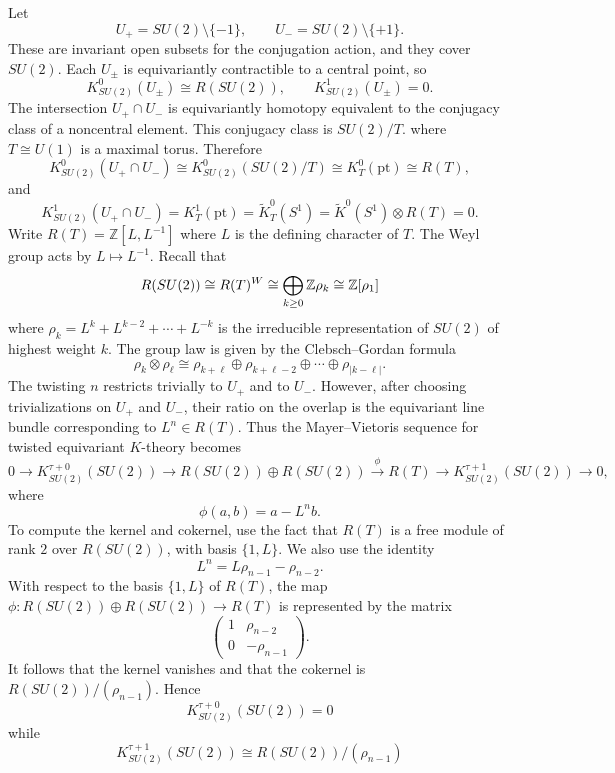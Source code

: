 \documentclass[12pt]{article}
\begin{document}
\begin{example}
    Let
    \[
        U_+=SU(2)\setminus\{-1\},
        \qquad
        U_-=SU(2)\setminus\{+1\}.
    \]
    These are invariant open subsets for the conjugation action, and they cover $SU(2)$. Each $U_\pm$ is equivariantly contractible to a central point, so
    \[
        K^0_{SU(2)}(U_\pm)\cong R(SU(2)),
        \qquad
        K^1_{SU(2)}(U_\pm)=0.
    \]
    The intersection $U_+\cap U_-$ is equivariantly homotopy equivalent to the conjugacy class of a noncentral element. This conjugacy class is $SU(2)/T$.
    where $T\cong U(1)$ is a maximal torus. Therefore
    \[
        K^0_{SU(2)}(U_+\cap U_-)
        \cong
        K^0_{SU(2)}(SU(2)/T)
        \cong
        K^0_T(\mathrm{pt})
        \cong
        R(T),
    \]
    and
    \[
        K^1_{SU(2)}(U_+\cap U_-)=K^1_T(\mathrm{pt})= \widetilde{K}^0_T(S^1)=\widetilde{K}^0(S^1) \otimes R(T)=0.
    \]
    Write $R(T)=\mathbb Z[L,L^{-1}]$ where $L$ is the defining character of $T$. The Weyl group acts by $L\longmapsto L^{-1}$. Recall that
    \[
        R(SU(2))\cong R(T)^W \cong \bigoplus_{k\ge 0} \mathbb{Z}\rho_k \cong \mathbb{Z}[\rho_1]
    \]
    where $\rho_k=L^k+L^{k-2}+\cdots+L^{-k}$ is the irreducible representation of $SU(2)$ of highest weight $k$. The group law is given by the Clebsch--Gordan formula
    \[
        \rho_k\otimes\rho_\ell
        \cong
        \rho_{k+\ell}\oplus\rho_{k+\ell-2}\oplus\cdots\oplus\rho_{|k-\ell|}.
    \]
    The twisting $n$ restricts trivially to $U_+$ and to $U_-$. However, after choosing trivializations on $U_+$ and $U_-$, their ratio on the overlap is the equivariant line bundle corresponding to $L^n\in R(T)$.
    Thus the Mayer--Vietoris sequence for twisted equivariant $K$-theory becomes
    \[
        0
        \longrightarrow
        K^{\tau+0}_{SU(2)}(SU(2))
        \longrightarrow
        R(SU(2))\oplus R(SU(2))
        \xrightarrow{\;\phi\;}
        R(T)
        \longrightarrow
        K^{\tau+1}_{SU(2)}(SU(2))
        \longrightarrow
        0,
    \]
    where
    \[
        \phi(a,b)=a-L^n b.
    \]
    To compute the kernel and cokernel, use the fact that $R(T)$ is a free module of rank $2$ over $R(SU(2))$, with basis $\{1,L\}$. We also use the identity
    \[
        L^n=L\rho_{n-1}-\rho_{n-2}.
    \]
    With respect to the basis $\{1,L\}$ of $R(T)$, the map $\phi: R(SU(2))\oplus R(SU(2))\to R(T)$ is represented by the matrix
    \[
        \begin{pmatrix}
            1 & \rho_{n-2}  \\
            0 & -\rho_{n-1}
        \end{pmatrix}.
    \]
    It follows that the kernel vanishes and that the cokernel is $R(SU(2))/(\rho_{n-1})$.
    Hence
    \[
        K^{\tau+0}_{SU(2)}(SU(2))=0
    \]
    while
    \[
        K^{\tau+1}_{SU(2)}(SU(2))
        \cong
        R(SU(2))/(\rho_{n-1})
    \]
\end{example}
\end{document}
